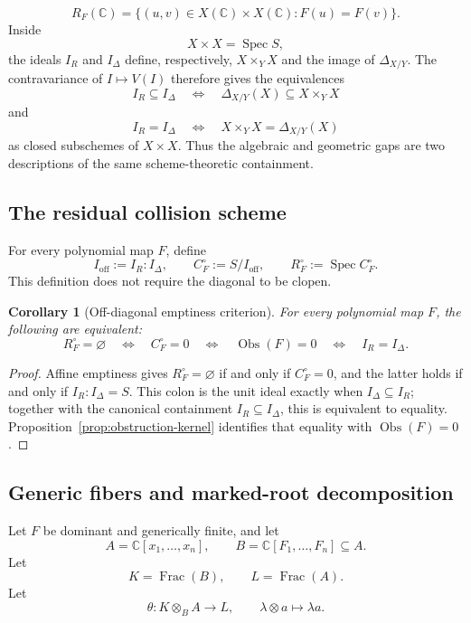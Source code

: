 \documentclass[11pt]{article}
\newtheorem{corollary}[theorem]{Corollary}
\theoremstyle{remark}
\theoremstyle{definition}
\DeclareMathOperator{\Spec}{Spec}
\DeclareMathOperator{\Frac}{Frac}
\newcommand{\C}{\mathbb C}
\newcommand{\Obs}{\operatorname{Obs}}
\begin{document}
\[
  R_F(\C)
  =
  \{(u,v)\in X(\C)\times X(\C):F(u)=F(v)\}.
\]
Inside
\[
  X\times X=\Spec S,
\]
the ideals \(I_R\) and \(I_\Delta\) define, respectively,
\(X\times_YX\) and the image of \(\Delta_{X/Y}\).  The
contravariance of \(I\mapsto V(I)\) therefore gives the equivalences
\[
  I_R\subseteq I_\Delta
  \quad\Longleftrightarrow\quad
  \Delta_{X/Y}(X)\subseteq X\times_YX
\]
and
\[
  I_R=I_\Delta
  \quad\Longleftrightarrow\quad
  X\times_YX=\Delta_{X/Y}(X)
\]
as closed subschemes of \(X\times X\).  Thus the algebraic and
geometric gaps are two descriptions of the same scheme-theoretic
containment.

\subsection{The residual collision scheme}
\label{sec:residual-collision-scheme}

For every polynomial map \(F\), define
\[
  I_{\mathrm{off}}:=I_R:I_\Delta,
  \qquad
  C_F^\circ:=S/I_{\mathrm{off}},
  \qquad
  R_F^\circ:=\Spec C_F^\circ.
\]
This definition does not require the diagonal to be clopen.

\begin{corollary}[Off-diagonal emptiness criterion]
\label{cor:off-diagonal-empty-criterion}
For every polynomial map \(F\), the following are equivalent:
\[
  R_F^\circ=\varnothing
  \quad\Longleftrightarrow\quad
  C_F^\circ=0
  \quad\Longleftrightarrow\quad
  \Obs(F)=0
  \quad\Longleftrightarrow\quad
  I_R=I_\Delta.
\]
\end{corollary}

\begin{proof}
Affine emptiness gives \(R_F^\circ=\varnothing\) if and only if
\(C_F^\circ=0\), and the latter holds if and only if
\(I_R:I_\Delta=S\).  This colon is the unit ideal exactly when
\(I_\Delta\subseteq I_R\); together with the canonical containment
\(I_R\subseteq I_\Delta\), this is equivalent to equality.
Proposition~\ref{prop:obstruction-kernel} identifies that equality with
\(\Obs(F)=0\).
\end{proof}

\subsection{Generic fibers and marked-root decomposition}
\label{sec:generic-galois-bridge}

Let \(F\) be dominant and generically finite, and let
\[
  A=\C[x_1,\dots,x_n],
  \qquad
  B=\C[F_1,\dots,F_n]\subseteq A.
\]
Let
\[
  K=\Frac(B),
  \qquad
  L=\Frac(A).
\]
Let
\[
  \theta\colon K\otimes_BA\longrightarrow L,
  \qquad
  \lambda\otimes a\longmapsto\lambda a.
\]
\end{document}
